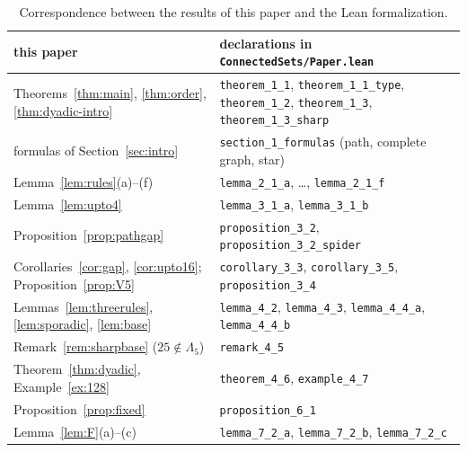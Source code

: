 \documentclass[11pt]{amsart}
\theoremstyle{definition}
\theoremstyle{remark}
\newcommand{\Lam}{\Lambda}
\begin{document}
\begin{table}[ht]
\centering
\small
\begin{tabular}{l>{\raggedright\arraybackslash}p{8.4cm}}
\toprule
this paper & declarations in \texttt{ConnectedSets/Paper.lean}\\
\midrule
Theorems~\ref{thm:main}, \ref{thm:order}, \ref{thm:dyadic-intro} & \texttt{theorem\_1\_1}, \texttt{theorem\_1\_1\_type}, \texttt{theorem\_1\_2}, \texttt{theorem\_1\_3}, \texttt{theorem\_1\_3\_sharp}\\
formulas of Section~\ref{sec:intro} & \texttt{section\_1\_formulas} (path, complete graph, star)\\
Lemma~\ref{lem:rules}(a)--(f) & \texttt{lemma\_2\_1\_a}, \dots, \texttt{lemma\_2\_1\_f}\\
Lemma~\ref{lem:upto4} & \texttt{lemma\_3\_1\_a}, \texttt{lemma\_3\_1\_b}\\
Proposition~\ref{prop:pathgap} & \texttt{proposition\_3\_2}, \texttt{proposition\_3\_2\_spider}\\
Corollaries~\ref{cor:gap}, \ref{cor:upto16}; Proposition~\ref{prop:V5} & \texttt{corollary\_3\_3}, \texttt{corollary\_3\_5}, \texttt{proposition\_3\_4}\\
Lemmas~\ref{lem:threerules}, \ref{lem:sporadic}, \ref{lem:base} & \texttt{lemma\_4\_2}, \texttt{lemma\_4\_3}, \texttt{lemma\_4\_4\_a}, \texttt{lemma\_4\_4\_b}\\
Remark~\ref{rem:sharpbase} ($25\notin\Lam_5$) & \texttt{remark\_4\_5}\\
Theorem~\ref{thm:dyadic}, Example~\ref{ex:128} & \texttt{theorem\_4\_6}, \texttt{example\_4\_7}\\
Proposition~\ref{prop:fixed} & \texttt{proposition\_6\_1}\\
Lemma~\ref{lem:F}(a)--(c) & \texttt{lemma\_7\_2\_a}, \texttt{lemma\_7\_2\_b}, \texttt{lemma\_7\_2\_c}\\
\bottomrule
\end{tabular}
\caption{Correspondence between the results of this paper and the Lean formalization.}
\label{tab:lean}
\end{table}
\end{document}
